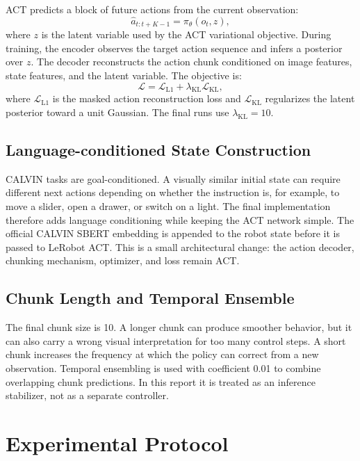 \documentclass[10pt,twocolumn]{article}
\begin{document}
ACT predicts a block of future actions from the current observation:
\[
  \hat{a}_{t:t+K-1} = \pi_{\theta}(o_t, z),
\]
where \(z\) is the latent variable used by the ACT variational objective. During training, the encoder observes the target action sequence and infers a posterior over \(z\). The decoder reconstructs the action chunk conditioned on image features, state features, and the latent variable. The objective is:
\begin{equation}
\mathcal{L} = \mathcal{L}_{\mathrm{L1}} + \lambda_{\mathrm{KL}}\mathcal{L}_{\mathrm{KL}},
\end{equation}
where \(\mathcal{L}_{\mathrm{L1}}\) is the masked action reconstruction loss and \(\mathcal{L}_{\mathrm{KL}}\) regularizes the latent posterior toward a unit Gaussian. The final runs use \(\lambda_{\mathrm{KL}}=10\).

\subsection{Language-conditioned State Construction}

CALVIN tasks are goal-conditioned. A visually similar initial state can require different next actions depending on whether the instruction is, for example, to move a slider, open a drawer, or switch on a light. The final implementation therefore adds language conditioning while keeping the ACT network simple. The official CALVIN SBERT embedding is appended to the robot state before it is passed to LeRobot ACT. This is a small architectural change: the action decoder, chunking mechanism, optimizer, and loss remain ACT.

\subsection{Chunk Length and Temporal Ensemble}

The final chunk size is 10. A longer chunk can produce smoother behavior, but it can also carry a wrong visual interpretation for too many control steps. A short chunk increases the frequency at which the policy can correct from a new observation. Temporal ensembling is used with coefficient 0.01 to combine overlapping chunk predictions. In this report it is treated as an inference stabilizer, not as a separate controller.

\section{Experimental Protocol}
\end{document}

